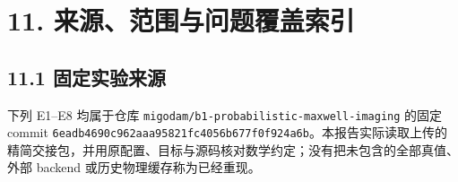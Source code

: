 \documentclass[
  11pt,
  a4paper,
]{article}
\begin{document}
\hypertarget{ux6765ux6e90ux8303ux56f4ux4e0eux95eeux9898ux8986ux76d6ux7d22ux5f15}{%
\section{11.
来源、范围与问题覆盖索引}\label{ux6765ux6e90ux8303ux56f4ux4e0eux95eeux9898ux8986ux76d6ux7d22ux5f15}}

\hypertarget{ux56faux5b9aux5b9eux9a8cux6765ux6e90}{%
\subsection{11.1
固定实验来源}\label{ux56faux5b9aux5b9eux9a8cux6765ux6e90}}

下列 E1--E8 均属于仓库 \nolinkurl{migodam/b1-probabilistic-maxwell-imaging}
的固定 commit
\nolinkurl{6eadb4690c962aaa95821fc4056b677f0f924a6b}。本报告实际读取上传的精简交接包，并用原配置、目标与源码核对数学约定；没有把未包含的全部真值、外部
backend 或历史物理缓存称为已经重现。
\end{document}
